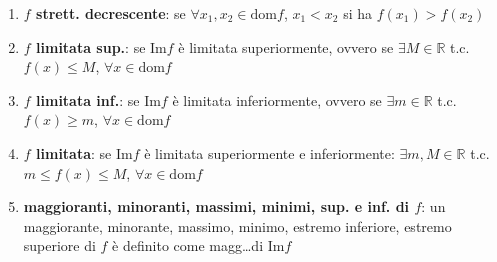 \documentclass[a4paper]{article}
\newcommand\dom{\text{dom}}
\newcommand\Img{\text{Im}}
\begin{document}
\begin{enumerate}
	\item \textbf{\(f\) strett. decrescente}: se \(\forall x_1, x_2 \in \dom f\), \(x_1 < x_2\) si ha \(f(x_1) > f(x_2)\)
	\item \textbf{\(f\) limitata sup.}: se \(\Img f\) è limitata superiormente, ovvero se \(\exists M \in \mathbb{R}\) t.c. \(f(x) \leq M\), \(\forall x \in \dom f\)
	\item \textbf{\(f\) limitata inf.}: se \(\Img f\) è limitata inferiormente, ovvero se \(\exists m \in \mathbb{R}\) t.c. \(f(x) \geq m\), \(\forall x \in \dom f\)
	\item \textbf{\(f\) limitata}: se \(\Img f\) è limitata superiormente e inferiormente: \(\exists m, M \in \mathbb{R}\) t.c. \(m \leq f(x) \leq M\), \(\forall x \in \dom f\)
	\item \textbf{maggioranti, minoranti, massimi, minimi, sup. e inf. di \(f\)}: un maggiorante, minorante, massimo, minimo, estremo inferiore, estremo superiore di \(f\) è definito come magg\dots di \(\Img f\)
\end{enumerate}
\end{document}
